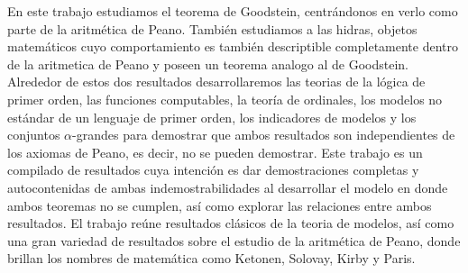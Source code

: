 En este trabajo estudiamos el teorema de Goodstein, centrándonos en verlo como parte de la aritmética de Peano. También estudiamos a las hidras, objetos matemáticos cuyo comportamiento es también descriptible completamente dentro de la aritmetica de Peano y poseen un teorema analogo al de Goodstein.
Alrededor de estos dos resultados desarrollaremos las teorias de la lógica de primer orden, las funciones computables, la teoría de ordinales, los modelos no estándar de un lenguaje de primer orden, los indicadores de modelos y los conjuntos $\alpha$-grandes para demostrar que ambos resultados son independientes de los axiomas de Peano, es decir, no se pueden demostrar.
Este trabajo es un compilado de resultados cuya intención es dar demostraciones completas y autocontenidas de ambas indemostrabilidades al desarrollar el modelo en donde ambos teoremas no se cumplen, así como explorar las relaciones entre ambos resultados.
El trabajo reúne resultados clásicos de la teoria de modelos, así como una gran variedad de resultados sobre el estudio de la aritmética de Peano, donde brillan los nombres de matemática como Ketonen, Solovay, Kirby y Paris.